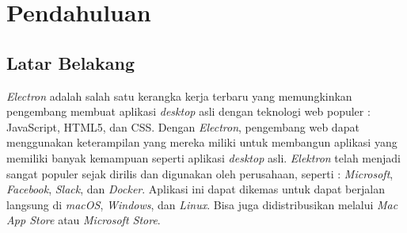 \chapter{Pendahuluan}
\label{chap:intro}
   
\section{Latar Belakang}
\label{sec:label}

\begin{comment}
Dibutuhkan waktu yang lama bagi para pengembang web yang ingin membuat aplikasi \textit{desktop}, dimana mereka perlu mempelajari bahasa baru bersamaan dengan kerangka kerjanya. Hal ini tentunya akan menjadi penghalang bagi mereka yang mau mengembangkan aplikasi desktop. Maka dari itu, saat ini terdapat sebuah kerangka kerja yang tersedia bagi pengembang web untuk membuat aplikasi \textit{desktop} lintas \textit{platform}. 
\end{comment}


\textit{Electron} adalah salah satu kerangka kerja terbaru yang memungkinkan pengembang membuat aplikasi \textit{desktop} asli dengan teknologi web populer : JavaScript, HTML5, dan CSS. Dengan \textit{Electron}, pengembang web dapat menggunakan keterampilan yang mereka miliki untuk membangun aplikasi yang memiliki banyak kemampuan seperti aplikasi \textit{desktop} asli. \textit{Elektron} telah menjadi sangat populer sejak dirilis dan digunakan oleh perusahaan, seperti : \textit{Microsoft}, \textit{Facebook}, \textit{Slack}, dan \textit{Docker}. Aplikasi ini dapat dikemas untuk dapat berjalan langsung di \textit{macOS}, \textit{Windows}, dan \textit{Linux}. Bisa juga didistribusikan melalui \textit{Mac App Store} atau \textit{Microsoft Store}.

\begin{comment}
Dalam pembuatan sebuah aplikasi \textit{desktop}, tentunya kita memerlukan \textit{library} untuk membantu kita dalam membuat aplikasi tersebut. Terdapat banyak \textit{library} visualisasi yang tersedia, contohnya : \textit{Vega}, \textit{D3}, dan \textit{Vis js}. Namun untuk \textit{library} visualisasi \textit{Vega} dan \textit{D3} terlalu \textit{powerful} untuk menangani proyek visualisasi kurikulum dalam bentuk \textit{tree} dan \textit{timeline}. Library visualisasi \textit{Vis js} sudah sangat memadai untuk menangani proyek tersebut.
\end{comment}

